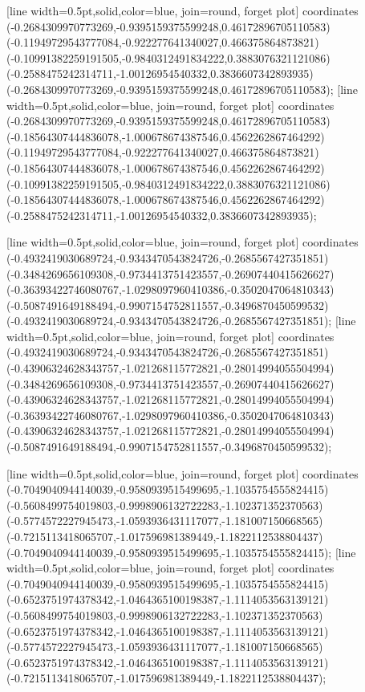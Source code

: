 [line width=0.5pt,solid,color=blue, join=round, forget plot] coordinates {(-0.2684309970773269,-0.9395159375599248,0.46172896705110583) (-0.11949729543777084,-0.922277641340027,0.466375864873821) (-0.10991382259191505,-0.9840312491834222,0.3883076321121086) (-0.2588475242314711,-1.00126954540332,0.3836607342893935) (-0.2684309970773269,-0.9395159375599248,0.46172896705110583)};
[line width=0.5pt,solid,color=blue, join=round, forget plot] coordinates {(-0.2684309970773269,-0.9395159375599248,0.46172896705110583) (-0.18564307444836078,-1.000678674387546,0.4562262867464292) (-0.11949729543777084,-0.922277641340027,0.466375864873821) (-0.18564307444836078,-1.000678674387546,0.4562262867464292) (-0.10991382259191505,-0.9840312491834222,0.3883076321121086) (-0.18564307444836078,-1.000678674387546,0.4562262867464292) (-0.2588475242314711,-1.00126954540332,0.3836607342893935)};

[line width=0.5pt,solid,color=blue, join=round, forget plot] coordinates {(-0.4932419030689724,-0.9343470543824726,-0.2685567427351851) (-0.3484269656109308,-0.9734413751423557,-0.26907440415626627) (-0.36393422746080767,-1.0298097960410386,-0.3502047064810343) (-0.5087491649188494,-0.9907154752811557,-0.3496870450599532) (-0.4932419030689724,-0.9343470543824726,-0.2685567427351851)};
[line width=0.5pt,solid,color=blue, join=round, forget plot] coordinates {(-0.4932419030689724,-0.9343470543824726,-0.2685567427351851) (-0.43906324628343757,-1.021268115772821,-0.28014994055504994) (-0.3484269656109308,-0.9734413751423557,-0.26907440415626627) (-0.43906324628343757,-1.021268115772821,-0.28014994055504994) (-0.36393422746080767,-1.0298097960410386,-0.3502047064810343) (-0.43906324628343757,-1.021268115772821,-0.28014994055504994) (-0.5087491649188494,-0.9907154752811557,-0.3496870450599532)};

[line width=0.5pt,solid,color=blue, join=round, forget plot] coordinates {(-0.7049040944140039,-0.9580939515499695,-1.1035754555824415) (-0.5608499754019803,-0.9998906132722283,-1.102371352370563) (-0.5774572227945473,-1.0593936431117077,-1.181007150668565) (-0.7215113418065707,-1.017596981389449,-1.1822112538804437) (-0.7049040944140039,-0.9580939515499695,-1.1035754555824415)};
[line width=0.5pt,solid,color=blue, join=round, forget plot] coordinates {(-0.7049040944140039,-0.9580939515499695,-1.1035754555824415) (-0.6523751974378342,-1.0464365100198387,-1.1114053563139121) (-0.5608499754019803,-0.9998906132722283,-1.102371352370563) (-0.6523751974378342,-1.0464365100198387,-1.1114053563139121) (-0.5774572227945473,-1.0593936431117077,-1.181007150668565) (-0.6523751974378342,-1.0464365100198387,-1.1114053563139121) (-0.7215113418065707,-1.017596981389449,-1.1822112538804437)};

